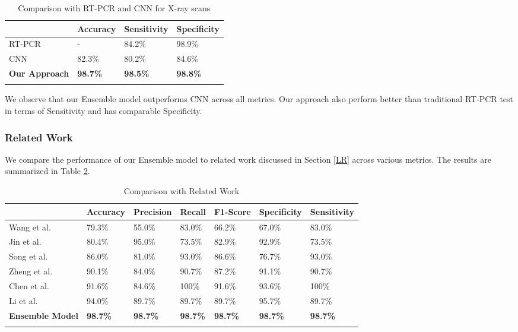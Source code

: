  \begin{longtable}{| p{} | p{} |  p{} |   p{} |} 
    \hline
& \textbf{Accuracy} & \textbf{Sensitivity} & \textbf{Specificity} \\
\hline

			RT-PCR      &-   &84.2\%    &98.9\%  
\\\hline
			CNN    &82.3\%   &80.2\%    &84.6\% 
\\\hline
			\textbf{Our Approach}   &\textbf{98.7\%}   &\textbf{98.5\%}    &\textbf{98.8\%} 
\\\hline
 \caption{Comparison with RT-PCR and CNN for X-ray scans}  \label{tab:compCT}
    \end{longtable}
\vspace{-1em}

We observe that our Ensemble model outperforms CNN across all metrics. Our approach also perform better than traditional RT-PCR test in terms of Sensitivity and has comparable Specificity.  

\subsubsection{Related Work}

We compare the performance of our Ensemble model to related work discussed in Section \ref{LR} across various metrics. The results are summarized in Table \ref{tab:relWorkCT}.


\vspace{1em}
 \begin{longtable}{| p{} |  p{} |   p{} | p{} | p{} | p{} | p{} |} 
    \hline
& \textbf{Accuracy} & \textbf{Precision} & \textbf{Recall} & \textbf{F1-Score} & \textbf{Specificity} & \textbf{Sensitivity} \\
\hline
Wang et al. \cite{WBX+2020} &79.3\%    &55.0\%     &83.0\%   &66.2\%    &67.0\%     &83.0\%
\\\hline
Jin et al. \cite{JCW+2020} &80.4\%    &95.0\%     &73.5\%   &82.9\%    &92.9\%     &73.5\%
\\\hline
Song et al. \cite{SZL+2020} &86.0\%    &81.0\%     &93.0\%   &86.6\%    &76.7\%     &93.0\%
\\\hline
Zheng et al. \cite{CXZ+2020}   &90.1\%    &84.0\%     &90.7\%   &87.2\%    &91.1\%     &90.7\%
\\\hline
Chen et al. \cite{CJL+2020}   &91.6\%    &84.6\%     &100\%   &91.6\%    &93.6\%     &100\%
\\\hline
Li et al. \cite{LLL+2020}   &94.0\%    &89.7\%     &89.7\%   &89.7\%    &95.7\%     &89.7\%
\\\hline
\textbf{Ensemble Model}    &\textbf{98.7\%}   &\textbf{98.7\%}    &\textbf{98.7\%}    &\textbf{98.7\%}   &\textbf{98.7\%}   &\textbf{98.7\%} 
\\\hline
 \caption{Comparison with Related Work}  \label{tab:relWorkCT}

    \end{longtable}
\vspace{-1em}

